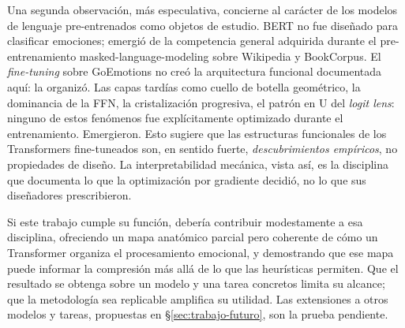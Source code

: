 Una segunda observación, más especulativa, concierne al carácter de los
modelos de lenguaje pre-entrenados como objetos de estudio. BERT no fue
diseñado para clasificar emociones; emergió de la competencia general
adquirida durante el pre-entrenamiento masked-language-modeling sobre Wikipedia
y BookCorpus. El \emph{fine-tuning} sobre GoEmotions no creó la arquitectura
funcional documentada aquí: la organizó. Las capas tardías como cuello de
botella geométrico, la dominancia de la FFN, la cristalización progresiva,
el patrón en U del \emph{logit lens}: ninguno de estos fenómenos fue explícitamente
optimizado durante el entrenamiento. Emergieron. Esto sugiere que las
estructuras funcionales de los Transformers fine-tuneados son, en sentido
fuerte, \emph{descubrimientos empíricos}, no propiedades de diseño. La
interpretabilidad mecánica, vista así, es la disciplina que documenta lo
que la optimización por gradiente decidió, no lo que sus diseñadores
prescribieron.

Si este trabajo cumple su función, debería contribuir modestamente a esa
disciplina, ofreciendo un mapa anatómico parcial pero coherente de cómo un
Transformer organiza el procesamiento emocional, y demostrando que ese
mapa puede informar la compresión más allá de lo que las heurísticas
permiten. Que el resultado se obtenga sobre un modelo y una tarea concretos
limita su alcance; que la metodología sea replicable amplifica su utilidad.
Las extensiones a otros modelos y tareas, propuestas en
\S\ref{sec:trabajo-futuro}, son la prueba pendiente.